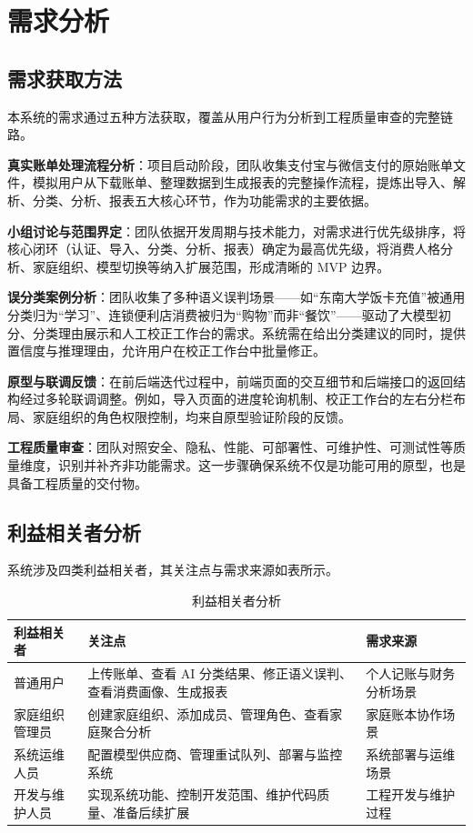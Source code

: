 \chapter{需求分析}

\section{需求获取方法}

本系统的需求通过五种方法获取，覆盖从用户行为分析到工程质量审查的完整链路。

\textbf{真实账单处理流程分析}：项目启动阶段，团队收集支付宝与微信支付的原始账单文件，模拟用户从下载账单、整理数据到生成报表的完整操作流程，提炼出导入、解析、分类、分析、报表五大核心环节，作为功能需求的主要依据。

\textbf{小组讨论与范围界定}：团队依据开发周期与技术能力，对需求进行优先级排序，将核心闭环（认证、导入、分类、分析、报表）确定为最高优先级，将消费人格分析、家庭组织、模型切换等纳入扩展范围，形成清晰的 MVP 边界。

\textbf{误分类案例分析}：团队收集了多种语义误判场景——如“东南大学饭卡充值”被通用分类归为“学习”、连锁便利店消费被归为“购物”而非“餐饮”——驱动了大模型初分、分类理由展示和人工校正工作台的需求。系统需在给出分类建议的同时，提供置信度与推理理由，允许用户在校正工作台中批量修正。

\textbf{原型与联调反馈}：在前后端迭代过程中，前端页面的交互细节和后端接口的返回结构经过多轮联调调整。例如，导入页面的进度轮询机制、校正工作台的左右分栏布局、家庭组织的角色权限控制，均来自原型验证阶段的反馈。

\textbf{工程质量审查}：团队对照安全、隐私、性能、可部署性、可维护性、可测试性等质量维度，识别并补齐非功能需求。这一步骤确保系统不仅是功能可用的原型，也是具备工程质量的交付物。

\section{利益相关者分析}

系统涉及四类利益相关者，其关注点与需求来源如表所示。

\begin{table}[H]
\centering
\caption{利益相关者分析}
\label{tab:stakeholders}
\begin{tabular}{p{3.2cm} p{5.2cm} p{5.2cm}}
\toprule
\textbf{利益相关者} & \textbf{关注点} & \textbf{需求来源} \\
\midrule
普通用户 & 上传账单、查看 AI 分类结果、修正语义误判、查看消费画像、生成报表 & 个人记账与财务分析场景 \\
\hline
家庭组织管理员 & 创建家庭组织、添加成员、管理角色、查看家庭聚合分析 & 家庭账本协作场景 \\
\hline
系统运维人员 & 配置模型供应商、管理重试队列、部署与监控系统 & 系统部署与运维场景 \\
\hline
开发与维护人员 & 实现系统功能、控制开发范围、维护代码质量、准备后续扩展 & 工程开发与维护过程 \\
\bottomrule
\end{tabular}
\end{table}

